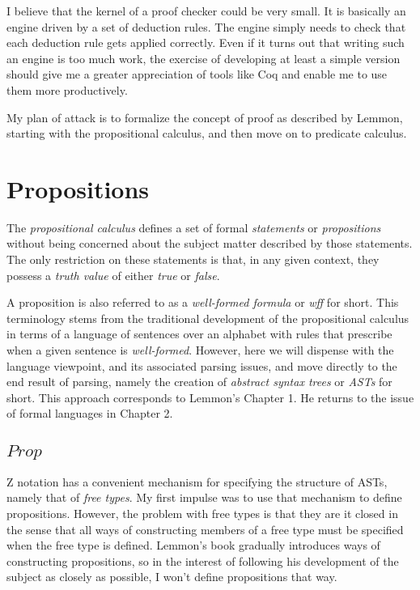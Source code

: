 \documentclass[11pt, oneside]{article}
\begin{document}
I believe that the kernel of a proof checker could be very small.
It is basically an engine driven by a set of deduction rules.
The engine simply needs to check that each deduction rule gets applied correctly.
Even if it turns out that writing such an engine is too much work, the exercise of developing
at least a simple version should give me a greater appreciation of tools like Coq and enable me to
use them more productively.

My plan of attack is to formalize the concept of proof as described by Lemmon, starting with
the propositional calculus, and then move on to predicate calculus.

\section{Propositions}

The {\it propositional calculus} defines a set of formal {\it statements} or {\it propositions}
without being concerned about the subject matter described by those statements.
The only restriction on these statements is that, in any given context, 
they possess a {\it truth value} of either {\it true} or {\it false}.

A proposition is also referred to as a {\it well-formed formula} or {\it wff} for short.
This terminology stems from the traditional development of the propositional calculus in terms of
a language of sentences over an alphabet with rules that prescribe when a given sentence is {\it well-formed}.
However, here we will dispense with the language viewpoint, and its associated parsing issues, and move directly
to the end result of parsing, namely the creation of {\it abstract syntax trees} or {\it ASTs} for short.
This approach corresponds to Lemmon's Chapter 1.
He returns to the issue of formal languages in Chapter 2.

\subsection{$Prop$}


Z notation has a convenient mechanism for specifying the structure of ASTs, namely that of {\it free types}.
My first impulse was to use that mechanism to define propositions.
However, the problem with free types is that they are {it closed} in the sense that all ways of constructing members of a free type
must be specified when the free type is defined.
Lemmon's book gradually introduces ways of constructing propositions, so in the interest of following his development of the subject
as closely as possible, I won't define propositions that way.
\end{document}
